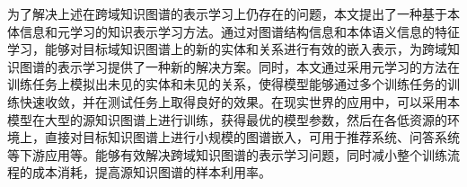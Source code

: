为了解决上述在跨域知识图谱的表示学习上仍存在的问题，本文提出了一种基于本体信息和元学习的知识表示学习方法。通过对图谱结构信息和本体语义信息的特征学习，能够对目标域知识图谱上的新的实体和关系进行有效的嵌入表示，为跨域知识图谱的表示学习提供了一种新的解决方案。同时，本文通过采用元学习的方法在训练任务上模拟出未见的实体和未见的关系，使得模型能够通过多个训练任务的训练快速收敛，并在测试任务上取得良好的效果。在现实世界的应用中，可以采用本模型在大型的源知识图谱上进行训练，获得最优的模型参数，然后在各低资源的环境上，直接对目标知识图谱上进行小规模的图谱嵌入，可用于推荐系统、问答系统等下游应用等。能够有效解决跨域知识图谱的表示学习问题，同时减小整个训练流程的成本消耗，提高源知识图谱的样本利用率。



